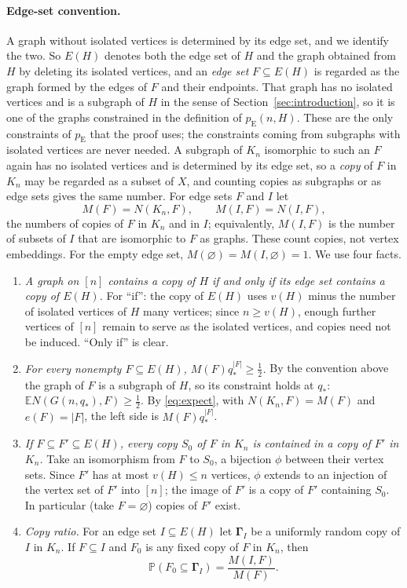 \documentclass[11pt]{article}
\numberwithin{equation}{section}
\newcommand{\PP}{\mathbb P}
\newcommand{\EE}{\mathbb E}
\newcommand{\pE}{p_{\mathrm E}}
\newcommand{\GG}{\boldsymbol\Gamma}
\newcommand{\qs}{q_*}
\begin{document}
\paragraph{Edge-set convention.}
A graph without isolated vertices is determined by its edge set, and we
identify the two. So $E(H)$ denotes both the edge set of $H$ and the
graph obtained from $H$ by deleting its isolated vertices, and an
\emph{edge set} $F\subseteq E(H)$ is regarded as the graph formed by
the edges of $F$ and their endpoints. That graph has no isolated
vertices and is a subgraph of $H$ in the sense of
Section~\ref{sec:introduction}, so it is one of the graphs constrained
in the definition of $\pE(n,H)$. These are the only constraints of
$\pE$ that the proof uses; the constraints coming from subgraphs with
isolated vertices are never needed. A subgraph of $K_n$ isomorphic to
such an $F$ again has no isolated vertices and is determined by its
edge set, so a \emph{copy} of $F$ in $K_n$ may be regarded as a subset
of $X$, and counting copies as subgraphs or as edge sets gives the same
number. For edge sets $F$ and $I$ let
\[
 M(F)=N(K_n,F),\qquad M(I,F)=N(I,F),
\]
the numbers of copies of $F$ in $K_n$ and in $I$; equivalently,
$M(I,F)$ is the number of subsets of $I$ that are isomorphic to $F$ as
graphs. These count copies, not vertex embeddings. For the empty edge
set, $M(\varnothing)=M(I,\varnothing)=1$. We use four facts.
\begin{enumerate}[label=(F\arabic*),leftmargin=2.6em,itemsep=3pt]
 \item \emph{A graph on $[n]$ contains a copy of $H$ if and only if its
 edge set contains a copy of $E(H)$.} For ``if'': the copy of $E(H)$
 uses $v(H)$ minus the number of isolated vertices of $H$ many
 vertices; since $n\ge v(H)$, enough further vertices of $[n]$ remain
 to serve as the isolated vertices, and copies need not be induced.
 ``Only if'' is clear.
 \item \emph{For every nonempty $F\subseteq E(H)$,
 $M(F)\qs^{|F|}\ge\frac12$.} By the convention above the graph of $F$
 is a subgraph of $H$, so its constraint holds at $\qs$:
 $\EE N(G(n,\qs),F)\ge\frac12$. By \eqref{eq:expect}, with
 $N(K_n,F)=M(F)$ and $e(F)=|F|$, the left side is $M(F)\qs^{|F|}$.
 \item \emph{If $F\subseteq F'\subseteq E(H)$, every copy $S_0$ of $F$
 in $K_n$ is contained in a copy of $F'$ in $K_n$.} Take an isomorphism
 from $F$ to $S_0$, a bijection $\phi$ between their vertex sets. Since
 $F'$ has at most $v(H)\le n$ vertices, $\phi$ extends to an injection
 of the vertex set of $F'$ into $[n]$; the image of $F'$ is a copy of
 $F'$ containing $S_0$. In particular (take $F=\varnothing$) copies of
 $F'$ exist.
 \item \emph{Copy ratio.} For an edge set $I\subseteq E(H)$ let $\GG_I$
 be a uniformly random copy of $I$ in $K_n$. If $F\subseteq I$ and
 $F_0$ is any fixed copy of $F$ in $K_n$, then
 \begin{equation}\label{eq:copy-ratio}
  \PP(F_0\subseteq\GG_I)=\frac{M(I,F)}{M(F)}.
 \end{equation}
\end{enumerate}
\end{document}

